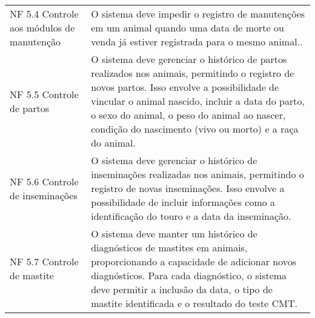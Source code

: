 \begin{tabframed}[!htb]
\begin{tabular}{|l|l|}
    \multicolumn{1}{|p{3cm}|}{\raggedright NF 5.4 Controle aos módulos de manutenção}
                  &

    \multicolumn{1}{|p{12cm}|}{\raggedright O sistema deve impedir o registro de manutenções em um animal quando uma data de morte ou venda já estiver registrada para o mesmo animal..}
    \\ \cline{1-2}

    \multicolumn{1}{|p{3cm}|}{\raggedright NF 5.5 Controle de partos}
                  &
    \multicolumn{1}{|p{12cm}|}{\raggedright O sistema deve gerenciar o histórico de partos realizados nos animais, permitindo o registro de novos partos. Isso envolve a possibilidade de vincular o animal nascido, incluir a data do parto, o sexo do animal, o peso do animal ao nascer, condição do nascimento (vivo ou morto) e a raça do animal.}
    \\ \cline{1-2}

    \multicolumn{1}{|p{3cm}|}{\raggedright NF 5.6 Controle de inseminações}
                  &

    \multicolumn{1}{|p{12cm}|}{\raggedright O sistema deve gerenciar o histórico de inseminações realizadas nos animais, permitindo o registro de novas inseminações. Isso envolve a possibilidade de incluir informações como a identificação do touro e a data da inseminação.}
    \\ \cline{1-2}

    \multicolumn{1}{|p{3cm}|}{\raggedright NF 5.7 Controle de mastite}
                  &
    \multicolumn{1}{|p{12cm}|}{\raggedright O sistema deve manter um histórico de diagnósticos de mastites em animais, proporcionando a capacidade de adicionar novos diagnósticos. Para cada diagnóstico, o sistema deve permitir a inclusão da data, o tipo de mastite identificada e o resultado do teste CMT.}
    \\ \cline{1-2}
  \end{tabular}
  \fonte{}
\end{tabframed}

